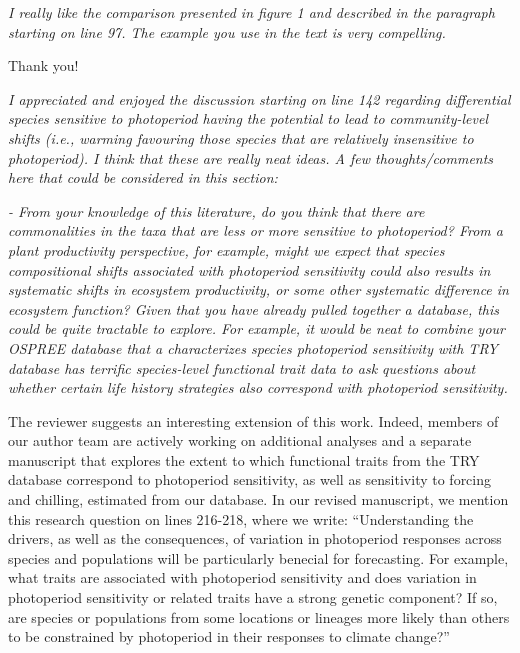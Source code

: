 \documentclass{article}
\begin{document}
\par \emph{I really like the comparison presented in figure 1 and described in the paragraph starting on line 97. The example you use in the text is very compelling. }
\par Thank you!
\par \emph{I appreciated and enjoyed the discussion starting on line 142 regarding differential species sensitive to photoperiod having the potential to lead to community-level shifts (i.e., warming favouring those species that are relatively insensitive to photoperiod). I think that these are really neat ideas. A few thoughts/comments here that could be considered in this section: }
\par \emph{- From your knowledge of this literature, do you think that there are commonalities in the taxa that are less or more sensitive to photoperiod? From a plant productivity perspective, for example, might we expect that species compositional shifts associated with photoperiod sensitivity could also results in systematic shifts in ecosystem productivity, or some other systematic difference in ecosystem function? Given that you have already pulled together a database, this could be quite tractable to explore. For example, it would be neat to combine your OSPREE database that a characterizes species photoperiod sensitivity with TRY database has terrific species-level functional trait data to ask questions about whether certain life history strategies also correspond with photoperiod sensitivity. }
\par The reviewer suggests an interesting extension of this work. Indeed, members of our author team are actively working on additional analyses and a separate manuscript that explores the extent to which functional traits from the TRY database correspond to photoperiod sensitivity, as well as sensitivity to forcing and chilling, estimated from our database. In our revised manuscript, we mention this research question on lines 216-218, where we write:
``Understanding the drivers, as well as the consequences, of variation in photoperiod responses across species and populations will be particularly benecial for forecasting. For example, what traits are associated with photoperiod sensitivity and does variation in photoperiod sensitivity or related traits have a strong genetic component? If so, are species or populations from some locations or lineages more likely than others to be constrained by photoperiod in their responses to climate change?''
\end{document}
